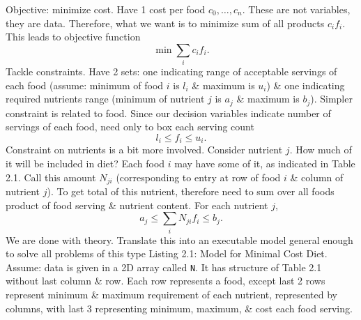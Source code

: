 \documentclass{article}
\begin{document}
\begin{itemize}
\begin{itemize}
\begin{itemize}
            Objective: minimize cost. Have 1 cost per food $c_0,\ldots,c_n$. These are not variables, they are data. Therefore, what we want is to minimize sum of all products $c_if_i$. This leads to objective function
            \begin{equation*}
                \min\sum_i c_if_i.
            \end{equation*}
            Tackle constraints. Have 2 sets: one indicating range of acceptable servings of each food (assume: minimum of food $i$ is $l_i$ \& maximum is $u_i$) \& one indicating required nutrients range (minimum of nutrient $j$ is $a_j$ \& maximum is $b_j$). Simpler constraint is related to food. Since our decision variables indicate number of servings of each food, need only to box each serving count
            \begin{equation*}
                l_i\le f_i\le u_i.
            \end{equation*}
            Constraint on nutrients is a bit more involved. Consider nutrient $j$. How much of it will be included in diet? Each food $i$ may have some of it, as indicated in Table 2.1. Call this amount $N_{ji}$ (corresponding to entry at row of food $i$ \& column of nutrient $j$). To get total of this nutrient, therefore need to sum over all foods product of food serving \& nutrient content. For each nutrient $j$,
            \begin{equation*}
                a_j\le\sum_i N_{ji}f_i\le b_j.
            \end{equation*}
            We are done with theory. Translate this into an executable model general enough to solve all problems of this type {\sf Listing 2.1: Model for Minimal Cost Diet}. Assume: data is given in a 2D array called {\tt N}. It has structure of Table 2.1 without last column \& row. Each row represents a food, except last 2 rows represent minimum \& maximum requirement of each nutrient, represented by columns, with last 3 representing minimum, maximum, \& cost each food serving.


\end{itemize}
\end{itemize}
\end{itemize}
\end{document}
